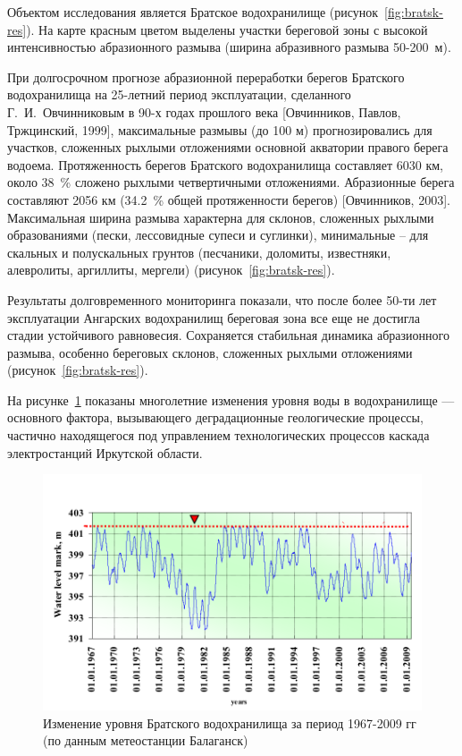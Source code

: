 \documentclass[732,14pt,final]{studrep}
\begin{document}
Объектом исследования является Братское водохранилище (рисунок~\ref{fig:bratsk-res}). На карте красным цветом выделены участки береговой зоны с высокой интенсивностью абразионного размыва (ширина абразивного размыва 50-200~м).

При долгосрочном прогнозе абразионной переработки берегов Братского водохранилища на 25-летний период эксплуатации, сделанного Г.~И.~Овчинниковым в 90-х годах прошлого века [Овчинников, Павлов, Тржцинский, 1999], максимальные размывы (до 100 м) прогнозировались для участков, сложенных рыхлыми отложениями основной акватории правого берега водоема.
Протяженность берегов Братского водохранилища составляет 6030 км, около 38~\% сложено рыхлыми четвертичными отложениями. Абразионные берега составляют 2056 км (34.2~\% общей протяженности берегов) [Овчинников, 2003]. Максимальная ширина размыва характерна для склонов, сложенных рыхлыми образованиями (пески, лессовидные супеси и суглинки), минимальные – для скальных и полускальных грунтов (песчаники, доломиты, известняки, алевролиты, аргиллиты, мергели) (рисунок~\ref{fig:bratsk-res}).

Результаты долговременного мониторинга показали, что после более 50-ти лет эксплуатации Ангарских водохранилищ береговая зона все еще не достигла стадии устойчивого равновесия.  Сохраняется стабильная динамика абразионного размыва, особенно береговых склонов, сложенных рыхлыми отложениями (рисунок~\ref{fig:bratsk-res}).


На рисунке~\ref{fig:water-level} показаны многолетние изменения уровня воды в  водохранилище — основного фактора, вызывающего деградационные геологические процессы, частично находящегося под управлением технологических процессов каскада электростанций Иркутской области.

\begin{center}
  \begin{figure}[htp]
	\centering
    \includegraphics[width=\linewidth]{pics/image17.png}
    \caption{Изменение уровня Братского водохранилища за период 1967-2009 гг (по данным метеостанции Балаганск)}
    \label{fig:water-level}
  \end{figure}
\end{center}
\end{document}

